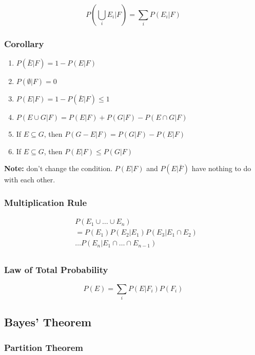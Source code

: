 $$ P\left(\bigcup_{i} E_i|F\right) = \sum_{i} P(E_i|F) $$

      \subsubsection*{Corollary}

      \begin{enumerate}
            \item $P(\bar{E}|F) = 1 - P(E|F)$
            \item $P(\emptyset|F) = 0$
            \item $P(E|F) = 1 - P(\bar{E}|F) \leq 1$
            \item $P(E \cup G|F) = P(E|F) + P(G|F) - P(E \cap G|F)$
            \item If $E \subseteq G$, then $P(G-E|F)=P(G|F)-P(E|F)$
            \item If $E \subseteq G$, then $P(E|F) \leq P(G|F)$
      \end{enumerate}

      \textbf{Note:} don't change the condition. $P(E|F)$ and $P(E|\bar{F})$ have nothing to do with each other.

      \subsubsection*{Multiplication Rule}

      \begin{align*}
             & P(E_1 \cup \dots \cup E_n)               \\
             & = P(E_1)P(E_2|E_1)P(E_3|E_1 \cap E_2)    \\
             & \dots P(E_n|E_1 \cap \dots \cap E_{n-1}) \\
      \end{align*}

      \subsubsection*{Law of Total Probability}

$$ P(E) = \sum_{i} P(E|F_i)P(F_i) $$

      \subsection*{Bayes' Theorem}

      \subsubsection*{Partition Theorem}


